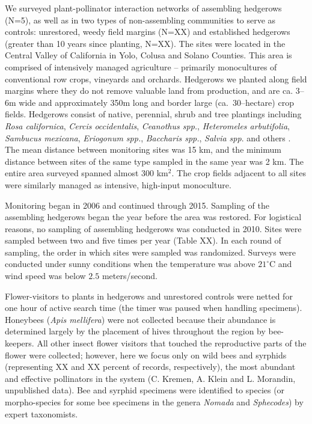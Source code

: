 \documentclass[12pt]{article}
\begin{document}
We surveyed plant-pollinator interaction networks of assembling
hedgerows (N=5), as well as in two types of non-assembling communities
to serve as controls: unrestored, weedy field margins (N=XX) and
established hedgerows (greater than 10 years since planting,
N=XX). The sites were located in the Central Valley of California in
Yolo, Colusa and Solano Counties. This area is comprised of
intensively managed agriculture -- primarily monocultures of
conventional row crops, vineyards and orchards. Hedgerows we planted
along field margins where they do not remove valuable land from
production, and are ca. 3--6m wide and approximately 350m long and
border large (ca.\ 30--hectare) crop fields. Hedgerows consist of
native, perennial, shrub and tree plantings including \textit{Rosa
  californica}, \textit{Cercis occidentalis}, \textit{Ceanothus spp.},
\textit{Heteromeles arbutifolia}, \textit{Sambucus mexicana},
\textit{Eriogonum spp.}, \textit{Baccharis spp.}, \textit{Salvia
  spp}. and others \citep{kremen-2015-602, mgonigle-2015-x}. The mean
distance between monitoring sites was 15 km, and the minimum distance
between sites of the same type sampled in the same year was 2 km.  The
entire area surveyed spanned almost 300 km$^2$. The crop fields
adjacent to all sites were similarly managed as intensive, high-input
monoculture.

Monitoring began in 2006 and continued through 2015. Sampling of the
assembling hedgerows began the year before the area was restored. For
logistical reasons, no sampling of assembling hedgerows was conducted
in 2010. Sites were sampled between two and five times per year (Table
XX). In each round of sampling, the order in which sites were sampled
was randomized. Surveys were conducted under sunny conditions when the
temperature was above $21^{\circ}\mathrm{C}$ and wind speed was below
$2.5$ meters/second.

Flower-visitors to plants in hedgerows and unrestored controls were
netted for one hour of active search time (the timer was paused when
handling specimens). Honeybees (\textit{Apis mellifera}) were not
collected because their abundance is determined largely by the
placement of hives throughout the region by bee-keepers. All other
insect flower visitors that touched the reproductive parts of the
flower were collected; however, here we focus only on wild bees and
syrphids (representing XX and XX percent of records, respectively),
the most abundant and effective pollinators in the system (C. Kremen,
A. Klein and L. Morandin, unpublished data). Bee and syrphid specimens
were identified to species (or morpho-species for some bee specimens
in the genera \textit{Nomada} and \textit{Sphecodes}) by expert
taxonomists.
\end{document}
